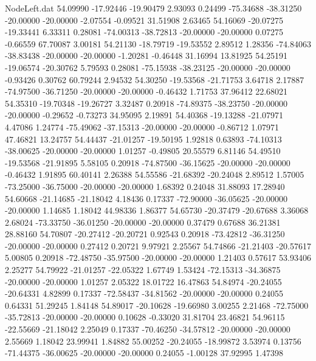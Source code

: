 \begin{filecontents}{NodeLeft.dat}
  54.09990  -17.92446  -19.90479     2.93093    0.24499  -75.34688  -38.31250  -20.00000  -20.00000   -2.07554   -0.09521   31.51908    2.63465
  54.16069  -20.07275  -19.33441     6.33311    0.28081  -74.00313  -38.72813  -20.00000  -20.00000    0.07275   -0.66559   67.70087    3.00181
  54.21130  -18.79719  -19.53552     2.89512    1.28356  -74.84063  -38.83438  -20.00000  -20.00000   -1.20281   -0.46448   31.16994   13.81925
  54.25191  -19.06574  -20.30762     5.79593    0.28081  -75.15938  -38.23125  -20.00000  -20.00000   -0.93426    0.30762   60.79244    2.94532
  54.30250  -19.53568  -21.71753     3.64718    2.17887  -74.97500  -36.71250  -20.00000  -20.00000   -0.46432    1.71753   37.96412   22.68021
  54.35310  -19.70348  -19.26727     3.32487    0.20918  -74.89375  -38.23750  -20.00000  -20.00000   -0.29652   -0.73273   34.95095    2.19891
  54.40368  -19.13288  -21.07971     4.47086    1.24774  -75.49062  -37.15313  -20.00000  -20.00000   -0.86712    1.07971   47.46821   13.24757
  54.44437  -21.01257  -19.50195     1.92818    0.63893  -74.10313  -38.00625  -20.00000  -20.00000    1.01257   -0.49805   20.55579    6.81146
  54.49510  -19.53568  -21.91895     5.58105    0.20918  -74.87500  -36.15625  -20.00000  -20.00000   -0.46432    1.91895   60.40141    2.26388
  54.55586  -21.68392  -20.24048     2.89512    1.57005  -73.25000  -36.75000  -20.00000  -20.00000    1.68392    0.24048   31.88093   17.28940
  54.60668  -21.14685  -21.18042     4.18436    0.17337  -72.90000  -36.05625  -20.00000  -20.00000    1.14685    1.18042   44.98336    1.86377
  54.65730  -20.37479  -20.67688     3.36068    2.68024  -73.33750  -36.01250  -20.00000  -20.00000    0.37479    0.67688   36.21381   28.88160
  54.70807  -20.27412  -20.20721     0.92543    0.20918  -73.42812  -36.31250  -20.00000  -20.00000    0.27412    0.20721    9.97921    2.25567
  54.74866  -21.21403  -20.57617     5.00805    0.20918  -72.48750  -35.97500  -20.00000  -20.00000    1.21403    0.57617   53.93406    2.25277
  54.79922  -21.01257  -22.05322     1.67749    1.53424  -72.15313  -34.36875  -20.00000  -20.00000    1.01257    2.05322   18.01722   16.47863
  54.84974  -20.24055  -20.64331     4.82899    0.17337  -72.58437  -34.81562  -20.00000  -20.00000    0.24055    0.64331   51.29245    1.84148
  54.89017  -20.10628  -19.66980     3.00255    2.21468  -72.75000  -35.72813  -20.00000  -20.00000    0.10628   -0.33020   31.81704   23.46821
  54.96115  -22.55669  -21.18042     2.25049    0.17337  -70.46250  -34.57812  -20.00000  -20.00000    2.55669    1.18042   23.99941    1.84882
  55.00252  -20.24055  -18.99872     3.53974    0.13756  -71.44375  -36.00625  -20.00000  -20.00000    0.24055   -1.00128   37.92995    1.47398

\end{filecontents}
